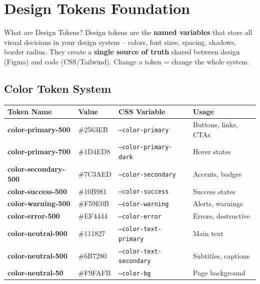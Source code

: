 \documentclass[12pt,a4paper]{article}
\begin{document}
\section{Design Tokens Foundation}

\begin{infobox}{What are Design Tokens?}
Design tokens are the \textbf{named variables} that store all visual decisions in your design system -- colors, font sizes, spacing, shadows, border radius. They create a \textbf{single source of truth} shared between design (Figma) and code (CSS/Tailwind). Change a token = change the whole system.
\end{infobox}

\subsection{Color Token System}

\begin{center}
\begin{tabularx}{\textwidth}{|>{\ttfamily\small\bfseries}l|>{\centering\arraybackslash}p{2.2cm}|X|X|}
\hline
\rowcolor{FaranDark}
\color{white}\textbf{Token Name} & \color{white}\textbf{Value} & \color{white}\textbf{CSS Variable} & \color{white}\textbf{Usage} \\
\hline
color-primary-500 & \#2563EB & \texttt{--color-primary} & Buttons, links, CTAs \\
\hline
\rowcolor{SectionBg}
color-primary-700 & \#1D4ED8 & \texttt{--color-primary-dark} & Hover states \\
\hline
color-secondary-500 & \#7C3AED & \texttt{--color-secondary} & Accents, badges \\
\hline
\rowcolor{SectionBg}
color-success-500 & \#10B981 & \texttt{--color-success} & Success states \\
\hline
color-warning-500 & \#F59E0B & \texttt{--color-warning} & Alerts, warnings \\
\hline
\rowcolor{SectionBg}
color-error-500 & \#EF4444 & \texttt{--color-error} & Errors, destructive \\
\hline
color-neutral-900 & \#111827 & \texttt{--color-text-primary} & Main text \\
\hline
\rowcolor{SectionBg}
color-neutral-500 & \#6B7280 & \texttt{--color-text-secondary} & Subtitles, captions \\
\hline
color-neutral-50 & \#F9FAFB & \texttt{--color-bg} & Page background \\
\hline
\end{tabularx}
\end{center}
\end{document}
